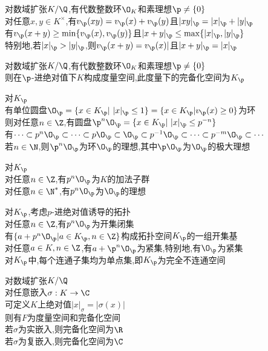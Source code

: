 \begin{dingli}
对数域扩张$K/\Q$,有代数整数环$\O_{K}$和素理想$\p\neq \{0\}$\\
对任意$x,y\in K^{\times}$,有$v_{\p}(xy)=v_{\p}(x)+v_{\p}(y)$且$|xy|_{\p}=|x|_{\p}+|y|_{\p}$\\
有$v_{\p}(x+y)\geq \min\{v_{\p}(x),v_{\p}(y)\}$且$|x+y|_{\p}\leq \max\{|x|_{\p},|y|_{\p}\}$\\
特别地,若$|x|_{\p}>|y|_{\p}$,则$v_{\p}(x+y)=v_{\p}(x)|$且$|x+y|_{\p}=|x|_{\p}$
\end{dingli}

\begin{dingyi}
对数域扩张$K/\Q$,有代数整数环$\O_{K}$和素理想$\p\neq \{0\}$\\
则在$\p$-进绝对值下$K$构成度量空间,此度量下的完备化空间为$K_{\p}$
\end{dingyi}

\begin{dingyi}
对$K_{\p}$\\
有单位圆盘$\O_{\p}=\{x\in K_{\p}|\ |x|_{\p}\leq 1\}=\{x\in K_{\p}|v_{\p}(x)\geq 0\}$为环\\
则对任意$n\in \Z$,有圆盘$\p^n\O_{\p}=\{x\in K_{\p}|\ |x|_{\p}\leq p^{-n}\}$\\
有$\cdots \subset p^n\O_{\p} \subset \cdots \subset p\O_{\p} \subset \O_{\p} \subset p^{-1}\O_{\p} \subset \cdots \subset p^{-m}\O_{\p} \subset \cdots$\\
若$n\in\N$,则$\p^n\O_{\p}$为环$\O_{\p}$的理想,其中$\p\O_{\p}$为$\O_{\p}$的极大理想
\end{dingyi}

\begin{dingli}
对$K_{\p}$\\
对任意$n\in \Z$,有$p^n\O_{\p}$为$K$的加法子群\\
对任意$n\in \N^*$,有$p^n\O_{\p}$为$\O_{\p}$的理想
\end{dingli}

\begin{dingli}
对$K_{\p}$,考虑$p$-进绝对值诱导的拓扑\\
对任意$n\in \Z$,有$p^n\O_{\p}$为开集闭集\\
有$\{a+p^n\O_{\p}|a\in K_{\p},n\in \Z\}$构成拓扑空间$K_{\p}$的一组开集基\\
对任意$a\in K,n\in \Z$,有$a+\p^n\O_{\p}$为紧集,特别地,有$\O_{\p}$为紧集\\
对$K_{\p}$中,每个连通子集均为单点集,即$K_{\p}$为完全不连通空间
\end{dingli}

\begin{dingyi}
对数域扩张$K/\Q$\\
对任意嵌入$\sigma:K\to \C$\\
可定义$K$上绝对值$|x|_{\sigma}=|\sigma(x)|$\\
则有$F$为度量空间和完备化空间\\
若$\sigma$为实嵌入,则完备化空间为$\R$\\
若$\sigma$为复嵌入,则完备化空间为$\C$
\end{dingyi}

